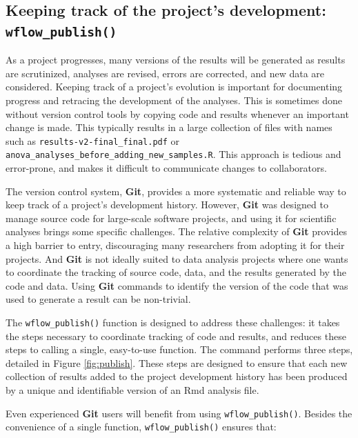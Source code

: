 \documentclass[9pt,a4paper]{extarticle}
\begin{document}
\subsection*{Keeping track of the project's development: \texttt{wflow\_publish()}}

As a project progresses, many versions of the results will be generated
as results are scrutinized, analyses are revised, errors are corrected,
and new data are considered. Keeping track of a project's evolution is
important for documenting progress and retracing the development of the
analyses. This is sometimes done without version control tools by
copying code and results whenever an important change is made. This
typically results in a large collection of files with names such as
\texttt{results-v2-final\_final.pdf} or
\texttt{anova\_analyses\_before\_adding\_new\_samples.R}. This approach
is tedious and error-prone, and makes it difficult to communicate
changes to collaborators.

The version control system, \textbf{Git}, provides a more systematic and reliable
way to keep track of a project's development history. However, \textbf{Git} was
designed to manage source code for large-scale software projects, and
using it for scientific analyses brings some specific challenges. The
relative complexity of \textbf{Git} provides a high barrier to entry,
discouraging many researchers from adopting it for their projects. And
 \textbf{Git} is not ideally suited to data analysis projects where one wants to
coordinate the tracking of source code, data, and the results generated
by the code and data. Using \textbf{Git} commands to identify the version of the
code that was used to generate a result can be non-trivial.

The \texttt{wflow\_publish()} function is designed to address these challenges: it
takes the steps necessary to coordinate tracking of code and results,
and reduces these steps to calling a single, easy-to-use function. The
command performs three steps, detailed in Figure \ref{fig:publish}. These steps are
designed to ensure that each new collection of results added to the
project development history has been produced by a unique and
identifiable version of an Rmd analysis file.

Even experienced \textbf{Git} users will benefit from using \texttt{wflow\_publish()}.
Besides the convenience of a single function, \texttt{wflow\_publish()} ensures
that:
\end{document}
